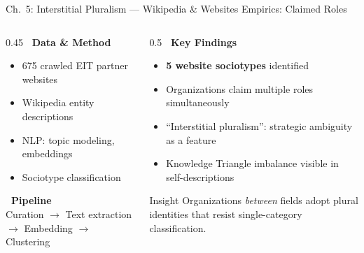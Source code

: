 \documentclass[aspectratio=169]{beamer}
\newcommand{\secmark}[1]{\hfill{\scriptsize\color{gray}#1}}
\begin{document}
\begin{frame}{Ch.~5: Interstitial Pluralism --- Wikipedia \& Websites}
\secmark{Empirics: Claimed Roles}
\begin{columns}[T]
\begin{column}{0.45\textwidth}
    \textbf{\faDatabase\ Data \& Method}
    \begin{itemize}
        \item 675 crawled EIT partner websites
        \item Wikipedia entity descriptions
        \item NLP: topic modeling, embeddings
        \item Sociotype classification
    \end{itemize}
    \vspace{0.5em}
    \textbf{\faCogs\ Pipeline}\\
    {\small Curation $\to$ Text extraction $\to$ Embedding $\to$ Clustering}
\end{column}
\begin{column}{0.5\textwidth}
    \textbf{\faLightbulb[regular]\ Key Findings}
    \begin{itemize}
        \item \textbf{5 website sociotypes} identified
        \item Organizations claim multiple roles simultaneously
        \item ``Interstitial pluralism'': strategic ambiguity as a feature
        \item Knowledge Triangle imbalance visible in self-descriptions
    \end{itemize}
    \vspace{0.3em}
    \begin{block}{\scriptsize Insight}
        \scriptsize Organizations \emph{between} fields adopt plural identities that resist single-category classification.
    \end{block}
\end{column}
\end{columns}
\end{frame}
\end{document}
